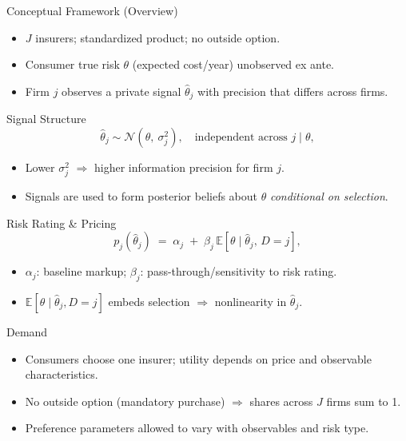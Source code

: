 \documentclass[11pt]{beamer}
\begin{document}
\begin{frame}{Conceptual Framework (Overview)}
\justifying
\begin{itemize}
  \item $J$ insurers; standardized product; no outside option.
  \item Consumer true risk $\theta$ (expected cost/year) unobserved ex ante.
  \item Firm $j$ observes a private signal $\hat{\theta}_j$ with precision that differs across firms.
\end{itemize}
\end{frame}

\begin{frame}{Signal Structure}
\justifying
\begin{equation}
\hat{\theta}_j \sim \mathcal{N}(\theta,\ \sigma_j^2), \quad \text{independent across } j \mid \theta, 
\label{eq:signal}
\end{equation}
\begin{itemize}
  \item Lower $\sigma_j^2$ $\Rightarrow$ higher information precision for firm $j$.
  \item Signals are used to form posterior beliefs about $\theta$ \emph{conditional on selection}.
\end{itemize}
\end{frame}

\begin{frame}{Risk Rating \& Pricing}
\justifying
\begin{equation}
p_j(\hat{\theta}_j) \;=\; \alpha_j \;+\; \beta_j \, \mathbb{E}[\theta \mid \hat{\theta}_j,\, D=j],
\label{eq:pricing}
\end{equation}
\begin{itemize}
  \item $\alpha_j$: baseline markup; $\beta_j$: pass-through/sensitivity to risk rating.
  \item $\mathbb{E}[\theta \mid \hat{\theta}_j, D=j]$ embeds selection $\Rightarrow$ nonlinearity in $\hat{\theta}_j$.
\end{itemize}
\end{frame}

\begin{frame}{Demand}
\justifying
\begin{itemize}
  \item Consumers choose one insurer; utility depends on price and observable characteristics.
  \item No outside option (mandatory purchase) $\Rightarrow$ shares across $J$ firms sum to 1.
  \item Preference parameters allowed to vary with observables and risk type.
\end{itemize}
\end{frame}
\end{document}
